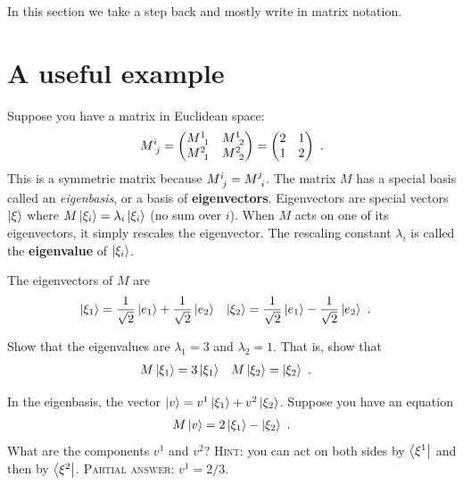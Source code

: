 \documentclass[12pt, oneside]{report}    %
\let\oldsection\section
\def\section{%
  \setcounter{sidenote}{1}%
  \oldsection
}
\begin{document}
In this section we take a step back and mostly write in matrix notation. 

\section{A useful example}

Suppose you have a matrix in Euclidean space:
\begin{align}
    M\aij{i}{j} =
    \begin{pmatrix}
        M\aij{1}{1} & M\aij{1}{2} \\
        M\aij{2}{1} & M\aij{2}{2}
    \end{pmatrix}=
    \begin{pmatrix}
        2 & 1 \\
        1 & 2
    \end{pmatrix} \ .
\end{align}
This is a symmetric matrix because $M\aij{i}{j} = M\aij{j}{i}$. The matrix $M$ has a special basis called an \emph{eigenbasis}, or a basis of \textbf{eigenvectors}. Eigenvectors are special vectors $\left|\xi\right\rangle$ where $M\left|\xi_i\right\rangle = \lambda_i \left|\xi_i\right\rangle$ (no sum over $i$). When $M$ acts on one of its eigenvectors, it simply rescales  the eigenvector. The rescaling constant $\lambda_i$ is called the \textbf{eigenvalue} of $\left|\xi_i\right\rangle$.


The eigenvectors of $M$ are
\begin{align}
    \left|\xi_1\right\rangle &= \frac{1}{\sqrt{2}}\left|e_1\right\rangle + \frac{1}{\sqrt{2}}\left|e_2\right\rangle
    &
    \left|\xi_2\right\rangle &= \frac{1}{\sqrt{2}}\left|e_1\right\rangle - \frac{1}{\sqrt{2}}\left|e_2\right\rangle \ .
\end{align}

\begin{exercise}
Show that the eigenvalues are $\lambda_1 = 3$ and $\lambda_2 = 1$. That is, show that
\begin{align}
M\left|\xi_1\right\rangle &= 3 \left|\xi_1\right\rangle
&
M\left|\xi_2\right\rangle &=  \left|\xi_2\right\rangle \ .
\end{align}
\end{exercise}

\begin{exercise}
In the eigenbasis, the vector $\left|v\right\rangle = v^1\left|\xi_1\right\rangle + v^2 \left|\xi_2\right\rangle$. Suppose you have an equation
\begin{align}
    M\left|v\right\rangle = 2 \left|\xi_1\right\rangle -  \left|\xi_2\right\rangle \ .
\end{align}
What are the components $v^1$ and $v^2$? \textsc{Hint}: you can act on both sides by $\left\langle\xi^1\right|$ and then by $\left\langle\xi^2\right|$. \textsc{Partial answer:} $v^1 = 2/3$. 
\end{exercise}
\end{document}
